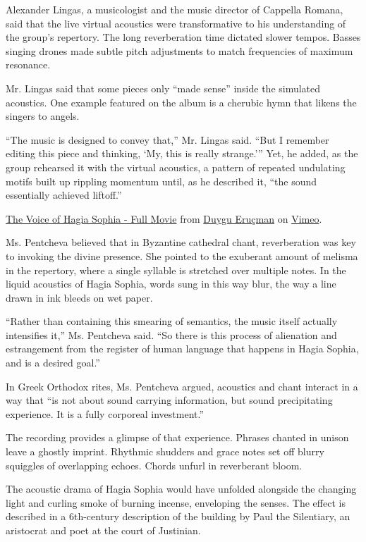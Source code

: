 Alexander Lingas, a musicologist and the music director of Cappella
Romana, said that the live virtual acoustics were transformative to his
understanding of the group's repertory. The long reverberation time
dictated slower tempos. Basses singing drones made subtle pitch
adjustments to match frequencies of maximum resonance.

Mr. Lingas said that some pieces only ``made sense'' inside the
simulated acoustics. One example featured on the album is a cherubic
hymn that likens the singers to angels.

``The music is designed to convey that,'' Mr. Lingas said. ``But I
remember editing this piece and thinking, `My, this is really
strange.''' Yet, he added, as the group rehearsed it with the virtual
acoustics, a pattern of repeated undulating motifs built up rippling
momentum until, as he described it, ``the sound essentially achieved
liftoff.''

\href{https://vimeo.com/357467398}{The Voice of Hagia Sophia - Full
Movie} from \href{https://vimeo.com/duyguerucman}{Duygu Eruçman} on
\href{https://vimeo.com}{Vimeo}.

Ms. Pentcheva believed that in Byzantine cathedral chant, reverberation
was key to invoking the divine presence. She pointed to the exuberant
amount of melisma in the repertory, where a single syllable is stretched
over multiple notes. In the liquid acoustics of Hagia Sophia, words sung
in this way blur, the way a line drawn in ink bleeds on wet paper.

``Rather than containing this smearing of semantics, the music itself
actually intensifies it,'' Ms. Pentcheva said. ``So there is this
process of alienation and estrangement from the register of human
language that happens in Hagia Sophia, and is a desired goal.''

In Greek Orthodox rites, Ms. Pentcheva argued, acoustics and chant
interact in a way that ``is not about sound carrying information, but
sound precipitating experience. It is a fully corporeal investment.''

The recording provides a glimpse of that experience. Phrases chanted in
unison leave a ghostly imprint. Rhythmic shudders and grace notes set
off blurry squiggles of overlapping echoes. Chords unfurl in reverberant
bloom.

The acoustic drama of Hagia Sophia would have unfolded alongside the
changing light and curling smoke of burning incense, enveloping the
senses. The effect is described in a 6th-century description of the
building by Paul the Silentiary, an aristocrat and poet at the court of
Justinian.

